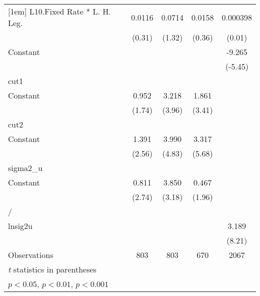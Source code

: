 {\begin{longtable}{l*{4}{c}}
[1em]
L10.Fixed Rate * L. H. Leg.&   0.0116         &   0.0714         &   0.0158         & 0.000398         \\
                &   (0.31)         &   (1.32)         &   (0.36)         &   (0.01)         \\
[1em]
Constant        &                  &                  &                  &   -9.265\sym{***}\\
                &                  &                  &                  &  (-5.45)         \\
\hline
cut1            &                  &                  &                  &                  \\
Constant        &    0.952         &    3.218\sym{***}&    1.861\sym{***}&                  \\
                &   (1.74)         &   (3.96)         &   (3.41)         &                  \\
\hline
cut2            &                  &                  &                  &                  \\
Constant        &    1.391\sym{*}  &    3.990\sym{***}&    3.317\sym{***}&                  \\
                &   (2.56)         &   (4.83)         &   (5.68)         &                  \\
\hline
sigma2\_u        &                  &                  &                  &                  \\
Constant        &    0.811\sym{**} &    3.850\sym{**} &    0.467         &                  \\
                &   (2.74)         &   (3.18)         &   (1.96)         &                  \\
\hline
/               &                  &                  &                  &                  \\
lnsig2u         &                  &                  &                  &    3.189\sym{***}\\
                &                  &                  &                  &   (8.21)         \\
\hline
Observations    &      803         &      803         &      670         &     2067         \\
\hline\hline
\multicolumn{5}{l}{\footnotesize \textit{t} statistics in parentheses}\\
\multicolumn{5}{l}{\footnotesize \sym{*} \(p<0.05\), \sym{**} \(p<0.01\), \sym{***} \(p<0.001\)}\\
\end{longtable}
}
